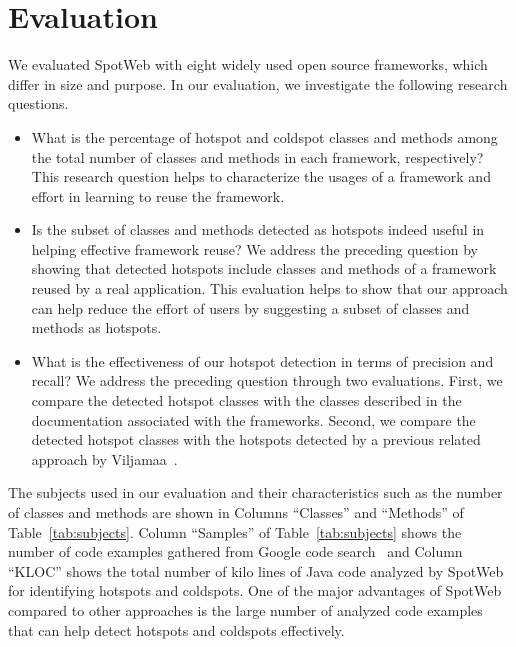\documentclass[conference]{IEEEtran}
\newcommand{\SmallSpace}{\vspace*{-1.5ex}}
\newenvironment{Itemize}{\begin{itemize}}{\end{itemize}\SmallSpace}
\begin{document}
\section {Evaluation}
\label{sec:eval}

We evaluated SpotWeb with eight widely used open source frameworks,
which differ in size and purpose. In our evaluation, we investigate the
following research questions. 

\begin{Itemize}
\item What is the percentage of hotspot and coldspot 
classes and methods among the total number of classes and methods in each framework, respectively? 
This research question helps to characterize the usages of a framework and 
effort in learning to reuse the framework. 
\item Is the subset of classes and methods detected
as hotspots indeed useful in helping effective framework reuse? We address the preceding question by 
showing that detected hotspots include classes and methods of a framework reused by a real application.
This evaluation helps to show that our approach can help reduce the effort
of users by suggesting a subset of classes and methods as hotspots.
\item What is the effectiveness of our hotspot detection in terms of precision and
recall? We address the preceding question through two evaluations. First, we compare
the detected hotspot classes with the classes described in the documentation associated
with the frameworks. Second, we compare the detected hotspot classes with 
the hotspots detected by a previous related approach by Viljamaa~\cite{viljamaa:reverse}.
\end{Itemize}

\vspace{1.5ex}
The subjects used in our evaluation and their
characteristics such as the number of classes and methods are shown
in Columns ``Classes'' and ``Methods'' of Table~\ref{tab:subjects}.
Column ``Samples'' of Table~\ref{tab:subjects} shows the number of
code examples gathered from Google code search~\cite{GCSE} and Column ``KLOC'' shows the total number of
kilo lines of Java code analyzed by SpotWeb for identifying hotspots
and coldspots. One of the major advantages of SpotWeb compared to
other approaches is the large number of analyzed code examples
that can help detect hotspots and coldspots effectively.
\end{document}
